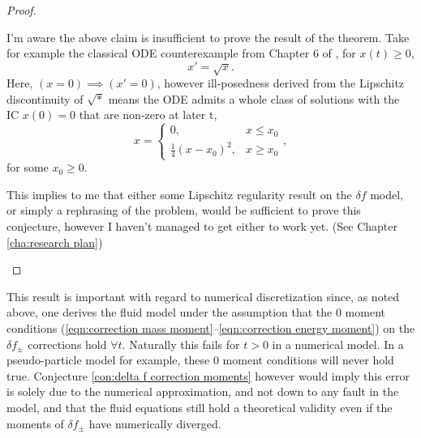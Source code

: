 \begin{proof}
\begin{enumerate}
            \begin{remark}
                I'm aware the above claim is insufficient to prove the result of the theorem. Take for example the classical ODE counterexample from Chapter 6 of \cite{Robinson_2004}, for $x(t)  \geq  0$,
                \begin{equation}
                    x'  =  \sqrt{x}.
                \end{equation}
                Here, $(x = 0)  \implies  (x'  =  0)$, however ill-posedness derived from the Lipschitz discontinuity of $\sqrt{*}$ means the ODE admits a whole class of solutions with the IC $x(0) = 0$ that are non-zero at later t,
                \begin{equation}
                    x  =  \left\{\begin{matrix}
                        0,                           &  x \leq x_{0}  \\ 
                        \frac{1}{4}(x - x_{0})^{2},  &  x \geq x_{0}
                    \end{matrix}\right.,
                \end{equation}
                for some $x_{0}  \geq  0$.
                
                This implies to me that either some Lipschitz regularity result on the $\delta\!f$ model, or simply a rephrasing of the problem, would be sufficient to prove this conjecture, however I haven't managed to get either to work yet. (See Chapter \ref{cha:research plan})
            \end{remark}
        \end{enumerate}
    \end{proof}

    This result is important with regard to numerical discretization since, as noted above, one derives the fluid model under the assumption that the 0 moment conditions (\ref{eqn:correction mass moment}--\ref{eqn:correction energy moment}) on the $\delta\!f_{\pm}$ corrections hold $\forall t$. Naturally this fails for $t > 0$ in a numerical model. In a pseudo-particle model for example, these 0 moment conditions will never hold true. Conjecture \ref{con:delta f correction moments} however would imply this error is solely due to the numerical approximation, and not down to any fault in the model, and that the fluid equations still hold a theoretical validity even if the moments of $\delta\!f_{\pm}$ have numerically diverged. 

